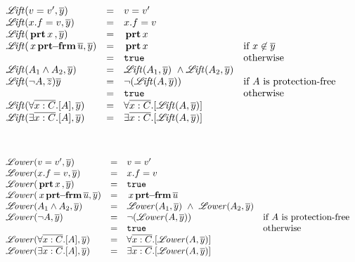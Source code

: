 $\begin{array}{lcll}
\lift {v=v'} {\overline  y}  & = & v=v' 
\\
\lift {x.f=v} {\overline y} & = & x.f=v 
\\
\lift{ \inside x}  {\overline  y}  & = &   \inside x 
\\
\lift{\protectedFrom x {\overline {u}} }  {\overline  y}  & = &   \inside x & \mbox{if } { x\not\in \overline{y}}
\\
   & = &   \prg{true} & \mbox{otherwise}

\\
\lift {A_1 \wedge A_2} {\overline   y}  & = & \lift { A_1} {\overline y}    \ \wedge \lift {A_2} {\overline y}  
\\
\lift {\neg A} {\overline z} {\overline y}  & = & \neg (\lift {A} {\overline y}  )& \mbox{if  $A$ is protection-free}
\\
  & = &  \prg{true} & \mbox{otherwise}
\\
\lift {\forall \overline{x:C}.[ A ]} {\overline   y}  & = & \forall \overline{x:C}.[ \lift A  {\overline y}  ] & 
\\
\lift {\exists \overline{x:C}.[ A ]} {\overline  y}  & = & \exists \overline{x:C}.[ \lift A  {\overline y}   ] & 
\end{array}
$

$\begin{array}{lcll}
\\
\\
\llower {v=v'} {\overline   y}   & = & v=v' 
\\
\llower {x.f=v} {\overline   y}  & = & x.f=v 
\\
\llower{ \inside x}  {\overline   y}  & = &   \prg{true}
\\
\llower{ \protectedFrom x {\overline {u}} }  {\overline   y}  & = &     \protectedFrom x {\overline {u}}  
\\
\llower {A_1 \wedge A_2} {\overline   y}  & = & \llower { A_1} {\overline   y} \ \wedge\ \llower {A_2}   {\overline   y} 
\\
\llower {\neg A}  {\overline   y}  & = & \neg (\llower  {A} {\overline   y} ) & \mbox{if  $A$ is protection-free}
\\
  & = &  \prg{true} & \mbox{otherwise}
\\
\llower {\forall \overline{x:C}.[ A ]} {\overline   y}   & = & \forall \overline{x:C}.[ \llower A   {\overline   y} ] & 
\\
\llower {\exists \overline{x:C}.[ A ]} {\overline   y}  & = & \exists \overline{x:C}.[ \llower A  {\overline   y} ] & 
\end{array}
$

